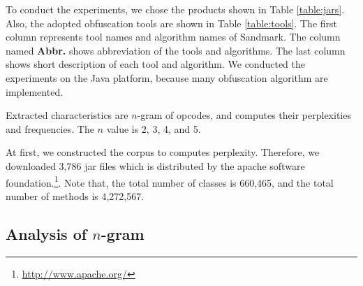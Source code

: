 \documentclass[conference]{IEEEtran}
\begin{document}
To conduct the experiments, we chose the products shown in Table
\ref{table:jars}.  Also, the adopted obfuscation tools are shown in
Table \ref{table:tools}.  The first column represents tool names and
algorithm names of Sandmark.  The column named \textbf{Abbr.} shows
abbreviation of the tools and algorithms.  The last column shows short
description of each tool and algorithm.
%
We conducted the experiments on the Java platform, because many
obfuscation algorithm are implemented.

Extracted characteristics are $n$-gram of opcodes, and computes their
perplexities and frequencies.  The $n$ value is 2, 3, 4, and 5.


At first, we constructed the corpus to computes perplexity.
Therefore, we downloaded 3,786 jar files which is distributed by the
apache software foundation.\footnote[4]{\url{http://www.apache.org/}}.
Note that, the total number of classes is 660,465, and the total
number of methods is 4,272,567.

\subsection{Analysis of $n$-gram}\label{sect:rq1}
\end{document}
